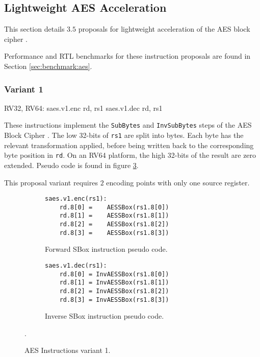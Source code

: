 
\newpage
\subsection{Lightweight AES Acceleration}

This section details $3.5$ proposals for lightweight acceleration of
the AES block cipher \cite{nist:fips:197}.

Performance and RTL benchmarks for these
instruction proposals are found in Section
\ref{sec:benchmark:aes}.


\subsubsection{Variant 1}

\begin{cryptoisa}
RV32, RV64:
    saes.v1.enc rd, rs1
    saes.v1.dec rd, rs1
\end{cryptoisa}

These instructions implement the 
{\tt SubBytes} \cite[Section 5.1.1]{nist:fips:197}
and
{\tt InvSubBytes} \cite[Section 5.3.1]{nist:fips:197}
steps of the AES Block Cipher \cite{nist:fips:197}.
The low 32-bits of {\tt rs1} are split into bytes.
Each byte has the relevant transformation applied, before
being written back to the corresponding byte position in {\tt rd}.
On an RV64 platform, the high 32-bits of the result are zero
extended.
Pseudo code is found in figure
\ref{fig:pseudo:aes:v1}.

This proposal variant requires $2$ encoding points with only one
source register.

\begin{figure}
\begin{subfigure}[b]{0.5\textwidth}
\begin{lstlisting}
saes.v1.enc(rs1):
    rd.8[0] =    AESSBox(rs1.8[0])
    rd.8[1] =    AESSBox(rs1.8[1])
    rd.8[2] =    AESSBox(rs1.8[2])
    rd.8[3] =    AESSBox(rs1.8[3])
\end{lstlisting}
\caption{Forward SBox instruction pseudo code.}
\label{fig:pseudo:aes:v1:sub:enc}
\end{subfigure}
\begin{subfigure}[b]{0.5\textwidth}
\begin{lstlisting}
saes.v1.dec(rs1):
    rd.8[0] = InvAESSBox(rs1.8[0])
    rd.8[1] = InvAESSBox(rs1.8[1])
    rd.8[2] = InvAESSBox(rs1.8[2])
    rd.8[3] = InvAESSBox(rs1.8[3])
\end{lstlisting}
\label{fig:pseudo:aes:v1:sub:dec}
\caption{Inverse SBox instruction pseudo code.}
\end{subfigure}
\caption{AES Instructions variant 1.}
\label{fig:pseudo:aes:v1}.
\end{figure}

